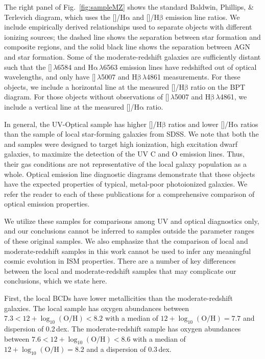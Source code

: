 \documentclass[preprint2]{aastex62}
\newcommand{\nii}{[\ion{N}{2}]}
\newcommand{\oiii}{[\ion{O}{3}]}
\newcommand{\ha}{\ensuremath{\mathrm{H\alpha}}\xspace}
\newcommand{\hb}{\ensuremath{\mathrm{H\beta}}\xspace}
\newcommand{\logten}{\ensuremath{\log_{10}}}
\newcommand{\logOH}{\ensuremath{\logten (\mathrm{O}/\mathrm{H})}\xspace}
\begin{document}
The right panel of Fig.~\ref{fig:sampleMZ} shows the standard Baldwin, Phillips, \& Terlevich \citep[BPT;][]{BPT} diagram, which uses the \nii{}/\ha{} and \oiii{}/\hb{} emission line ratios. We include empirically derived relationships used to separate objects with different ionizing sources; the dashed line shows the \citet{Kauffmann+2003b} separation between star formation and composite regions, and the solid black line shows the \citet{Kewley+2001} separation between AGN and star formation. Some of the moderate-redshift galaxies are sufficiently distant such that the \nii{}$\,\lambda$6584 and \ha{}$\,\lambda$6563 emission lines have redshifted out of optical wavelengths, and only have \oiii{}$\,\lambda$5007 and \hb{}$\,\lambda$4861 measurements. For these objects, we include a horizontal line at the measured \oiii{}/\hb{} ratio on the BPT diagram. For those objects without observations of \oiii{}$\,\lambda$5007 and \hb{}$\,\lambda$4861, we include a vertical line at the measured \nii{}/\ha{} ratio.

In general, the UV-Optical sample has higher \oiii{}/\hb{} ratios and lower \nii{}/\ha{} ratios than the sample of local star-forming galaxies from SDSS. We note that both the \citet{Berg+2016, Berg+2019} and \citet{Senchyna+2017, Senchyna+2019} samples were designed to target high ionization, high excitation dwarf galaxies, to maximize the detection of the UV C and O emission lines. Thus, their gas conditions are not representative of the local galaxy population as a whole. Optical emission line diagnostic diagrams demonstrate that these objects have the expected properties of typical, metal-poor photoionized galaxies. We refer the reader to each of these publications for a comprehensive comparison of optical emission properties.

We utilize these samples for comparisons among UV and optical diagnostics only, and our conclusions cannot be inferred to samples outside the parameter ranges of these original samples. We also emphasize that the comparison of local and moderate-redshift samples in this work cannot be used to infer any meaningful cosmic evolution in ISM properties. There are a number of key differences between the local and moderate-redshift samples that may complicate our conclusions, which we state here.

First, the local BCDs have lower metallicities than the moderate-redshift galaxies. The local sample has oxygen abundances between $7.3 < 12+\logOH < 8.2$ with a median of $12+\logOH = 7.7$ and dispersion of 0.2\,dex. The moderate-redshift sample has oxygen abundances between $7.6 < 12+\logOH < 8.6$ with a median of $12+\logOH = 8.2$ and a dispersion of 0.3\,dex.
\end{document}
